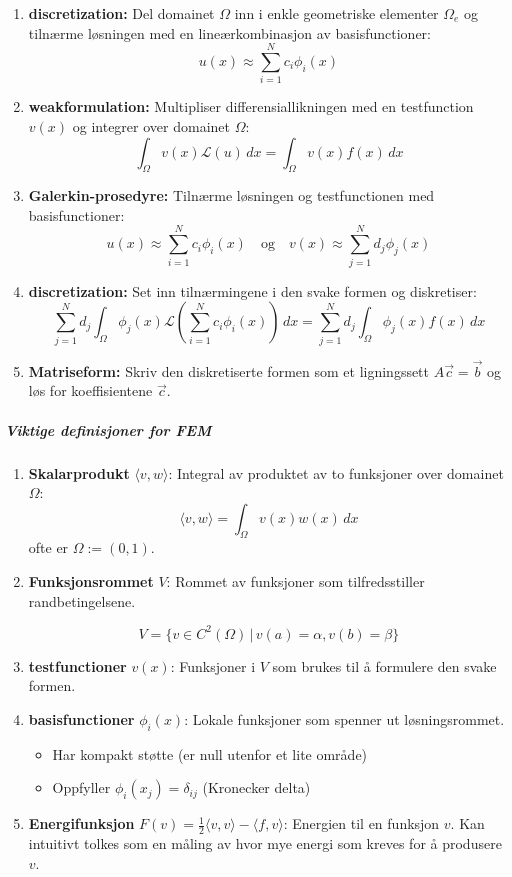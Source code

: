 \begin{enumerate}
  \item \textbf{\gls{discretization}:} Del \gls{domain}et \( \Omega \) inn i enkle geometriske elementer \( \Omega_e \) og tilnærme løsningen med en lineærkombinasjon av \gls{basisfunction}er:
        \[
          u(x) \approx \sum_{i=1}^N c_i \phi_i(x)
        \]
  \item \textbf{\gls{weakformulation}:} Multipliser differensiallikningen med en \gls{testfunction} \( v(x) \) og integrer over \gls{domain}et \( \Omega \):
        \[
          \int_\Omega v(x) \mathcal{L}(u) \, dx = \int_\Omega v(x) f(x) \, dx
        \]

  \item \textbf{Galerkin-prosedyre:} Tilnærme løsningen og \gls{testfunction}en med \gls{basisfunction}er:
        \[
          u(x) \approx \sum_{i=1}^N c_i \phi_i(x) \quad \text{og} \quad v(x) \approx \sum_{j=1}^N d_j \phi_j(x)
        \]
  \item \textbf{\gls{discretization}:} Set inn tilnærmingene i den svake formen og diskretiser:
        \[
          \sum_{j=1}^N d_j \int_\Omega \phi_j(x) \mathcal{L} \left( \sum_{i=1}^N c_i \phi_i(x) \right) \, dx = \sum_{j=1}^N d_j \int_\Omega \phi_j(x) f(x) \, dx
        \]
  \item \textbf{Matriseform:} Skriv den diskretiserte formen som et ligningssett \( A\vec{c} = \vec{b} \) og løs for koeffisientene \( \vec{c} \).
\end{enumerate}


\subparagraph{Viktige definisjoner for FEM}
\begin{enumerate}
  \item \textbf{Skalarprodukt} \(\langle v, w \rangle\): Integral av produktet av to funksjoner over \gls{domain}et \(\Omega\):
        \[ \langle v, w \rangle = \int_\Omega v(x)w(x) \, dx \]
        ofte er \(\Omega := (0,1)\).
  \item \textbf{Funksjonsrommet} \(V\): Rommet av funksjoner som tilfredsstiller randbetingelsene.

        \[ V = \{ v \in C^2(\Omega) \, | \, v(a) = \alpha, v(b) = \beta \} \]

  \item \textbf{\gls{testfunction}er} \(v(x)\): Funksjoner i \(V\) som brukes til å formulere den svake formen.
  \item \textbf{\gls{basisfunction}er} \(\phi_i(x)\): Lokale funksjoner som spenner ut løsningsrommet.
        \begin{itemize}
          \item Har kompakt støtte (er null utenfor et lite område)
          \item Oppfyller \(\phi_i(x_j) = \delta_{ij}\) (Kronecker delta)
        \end{itemize}
  \item \textbf{Energifunksjon} \(F(v) = \frac{1}{2} \langle v, v \rangle - \langle f, v \rangle\): Energien til en funksjon \(v\). Kan intuitivt tolkes som en måling av hvor mye energi som kreves for å produsere \(v\).
\end{enumerate}

